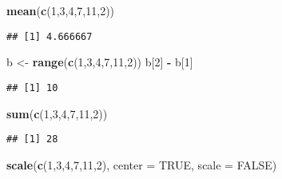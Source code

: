 \documentclass[
]{article}
\newenvironment{Shaded}{\begin{snugshade}}{\end{snugshade}}
\newcommand{\AttributeTok}[1]{\textcolor[rgb]{0.13,0.29,0.53}{#1}}
\newcommand{\ConstantTok}[1]{\textcolor[rgb]{0.56,0.35,0.01}{#1}}
\newcommand{\DecValTok}[1]{\textcolor[rgb]{0.00,0.00,0.81}{#1}}
\newcommand{\FunctionTok}[1]{\textcolor[rgb]{0.13,0.29,0.53}{\textbf{#1}}}
\newcommand{\NormalTok}[1]{#1}
\newcommand{\OtherTok}[1]{\textcolor[rgb]{0.56,0.35,0.01}{#1}}
\newcommand{\SpecialCharTok}[1]{\textcolor[rgb]{0.81,0.36,0.00}{\textbf{#1}}}
\begin{document}
\begin{Shaded}
\begin{Highlighting}[]
\FunctionTok{mean}\NormalTok{(}\FunctionTok{c}\NormalTok{(}\DecValTok{1}\NormalTok{,}\DecValTok{3}\NormalTok{,}\DecValTok{4}\NormalTok{,}\DecValTok{7}\NormalTok{,}\DecValTok{11}\NormalTok{,}\DecValTok{2}\NormalTok{))}
\end{Highlighting}
\end{Shaded}

\begin{verbatim}
## [1] 4.666667
\end{verbatim}

\begin{Shaded}
\begin{Highlighting}[]
\NormalTok{b }\OtherTok{\textless{}{-}} \FunctionTok{range}\NormalTok{(}\FunctionTok{c}\NormalTok{(}\DecValTok{1}\NormalTok{,}\DecValTok{3}\NormalTok{,}\DecValTok{4}\NormalTok{,}\DecValTok{7}\NormalTok{,}\DecValTok{11}\NormalTok{,}\DecValTok{2}\NormalTok{))}
\NormalTok{b[}\DecValTok{2}\NormalTok{] }\SpecialCharTok{{-}}\NormalTok{ b[}\DecValTok{1}\NormalTok{]}
\end{Highlighting}
\end{Shaded}

\begin{verbatim}
## [1] 10
\end{verbatim}

\begin{Shaded}
\begin{Highlighting}[]
\FunctionTok{sum}\NormalTok{(}\FunctionTok{c}\NormalTok{(}\DecValTok{1}\NormalTok{,}\DecValTok{3}\NormalTok{,}\DecValTok{4}\NormalTok{,}\DecValTok{7}\NormalTok{,}\DecValTok{11}\NormalTok{,}\DecValTok{2}\NormalTok{))}
\end{Highlighting}
\end{Shaded}

\begin{verbatim}
## [1] 28
\end{verbatim}

\begin{Shaded}
\begin{Highlighting}[]
\FunctionTok{scale}\NormalTok{(}\FunctionTok{c}\NormalTok{(}\DecValTok{1}\NormalTok{,}\DecValTok{3}\NormalTok{,}\DecValTok{4}\NormalTok{,}\DecValTok{7}\NormalTok{,}\DecValTok{11}\NormalTok{,}\DecValTok{2}\NormalTok{), }\AttributeTok{center =} \ConstantTok{TRUE}\NormalTok{, }\AttributeTok{scale =} \ConstantTok{FALSE}\NormalTok{)}
\end{Highlighting}
\end{Shaded}
\end{document}
